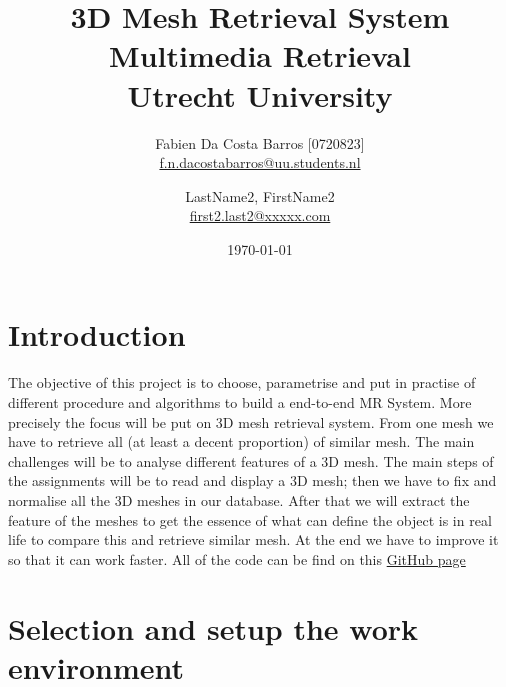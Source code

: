 \documentclass[10pt,twocolumn,letterpaper]{article}
\title{%
  3D Mesh Retrieval System \\
  \large Multimedia Retrieval \\
    Utrecht University}
\author{
  Fabien Da Costa Barros [0720823]\\
  \url{f.n.dacostabarros@uu.students.nl}
  \and
  LastName2, FirstName2\\
  \url{first2.last2@xxxxx.com}
}
\date{\today}
\begin{document}
\maketitle


\section*{Introduction}

The objective of this project is to choose, parametrise and put in practise of different procedure and algorithms to build a end-to-end MR System. More precisely the focus will be put on 3D mesh retrieval system. From one mesh we have to retrieve all (at least a decent proportion) of similar mesh. The main challenges will be to analyse different features of a 3D mesh. The main steps of the assignments will be to read and display a 3D mesh; then we have to fix and normalise all the 3D meshes in our database. After that we will extract the feature of the meshes to get the essence of what can define the object is in real life to compare this and retrieve similar mesh. At the end we have to improve it so that it can work faster. All of the code can be find on this \href{https://github.com/FDaCostaB/3DMeshRetrievalSystem}{GitHub page}  

\section{Selection and setup the work environment}
\end{document}
